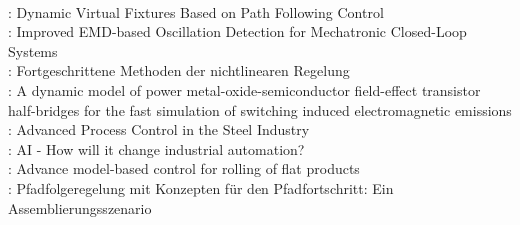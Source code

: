 \\
\cite{AIT-145989} : Dynamic Virtual Fixtures Based on Path Following Control
\\
\cite{AIT-145984} : Improved EMD-based Oscillation Detection for Mechatronic Closed-Loop Systems
\\
\cite{AIT-145737} : Fortgeschrittene Methoden der nichtlinearen Regelung
\\
\cite{AIT-145690} : A dynamic model of power metal-oxide-semiconductor field-effect transistor half-bridges for the fast simulation of switching induced electromagnetic emissions
\\
\cite{AIT-145460} : Advanced Process Control in the Steel Industry
\\
\cite{AIT-144906} : AI - How will it change industrial automation?
\\
\cite{AIT-144905} : Advance model-based control for rolling of flat products
\\
\cite{AIT-146335} : Pfadfolgeregelung mit Konzepten f{\"u}r den Pfadfortschritt: Ein Assemblierungsszenario

